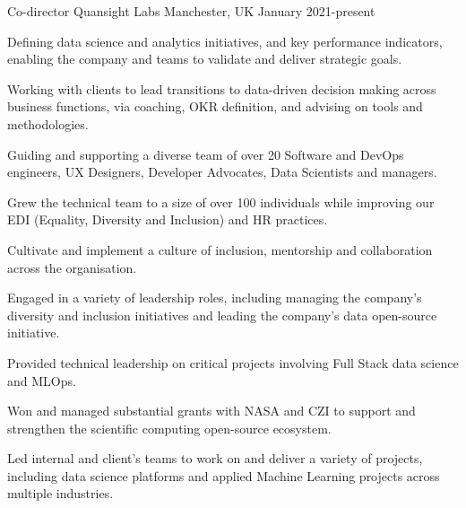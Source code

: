 


\begin{cventries}


\cventry
{Co-director} %
{Quansight Labs} %
{Manchester, UK} %
{January 2021-present } %
{ %
\begin{cvitems}
    \item{Defining data science and analytics initiatives, and key performance indicators, enabling the company and teams to validate and deliver strategic goals.}
    \item{Working with clients to lead transitions to data-driven decision making across business functions, via coaching, OKR definition, and advising on tools and methodologies.}
    \item {Guiding and supporting a diverse team of over 20 Software and DevOps engineers, UX Designers, Developer Advocates, Data Scientists and managers.}
    \item {Grew the technical team to a size of over 100 individuals while improving our EDI (Equality, Diversity and Inclusion) and HR practices.}
    \item {Cultivate and implement a culture of inclusion, mentorship and collaboration across the organisation.}
    \item {Engaged in a variety of leadership roles, including managing the company's diversity and inclusion initiatives and leading the company's data open-source initiative.}
    \item {Provided technical leadership on critical projects involving Full Stack data science and MLOps.}
    \item {Won and managed substantial grants with NASA and CZI to support and strengthen the scientific computing open-source ecosystem.}
    \item {Led internal and client's teams to work on and deliver a variety of projects, including data science platforms and applied Machine Learning projects across multiple industries.}

\end{cvitems}}
\end{cventries}
